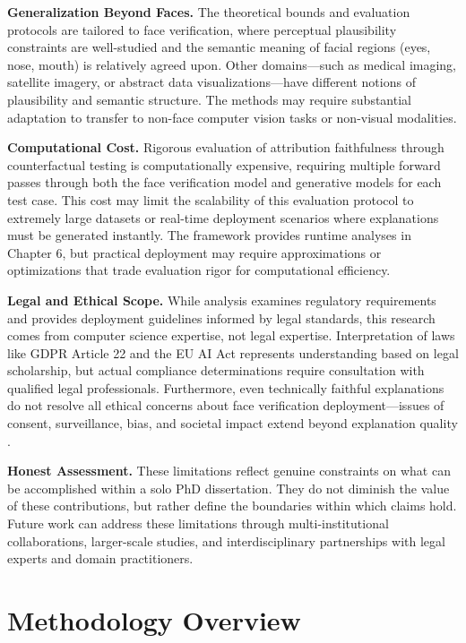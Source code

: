 \textbf{Generalization Beyond Faces.} The theoretical bounds and evaluation protocols are tailored to face verification, where perceptual plausibility constraints are well-studied and the semantic meaning of facial regions (eyes, nose, mouth) is relatively agreed upon. Other domains---such as medical imaging, satellite imagery, or abstract data visualizations---have different notions of plausibility and semantic structure. The methods may require substantial adaptation to transfer to non-face computer vision tasks or non-visual modalities.

\textbf{Computational Cost.} Rigorous evaluation of attribution faithfulness through counterfactual testing is computationally expensive, requiring multiple forward passes through both the face verification model and generative models for each test case. This cost may limit the scalability of this evaluation protocol to extremely large datasets or real-time deployment scenarios where explanations must be generated instantly. The framework provides runtime analyses in Chapter 6, but practical deployment may require approximations or optimizations that trade evaluation rigor for computational efficiency.

\textbf{Legal and Ethical Scope.} While analysis examines regulatory requirements and provides deployment guidelines informed by legal standards, this research comes from computer science expertise, not legal expertise. Interpretation of laws like GDPR Article 22 and the EU AI Act represents understanding based on legal scholarship, but actual compliance determinations require consultation with qualified legal professionals. Furthermore, even technically faithful explanations do not resolve all ethical concerns about face verification deployment---issues of consent, surveillance, bias, and societal impact extend beyond explanation quality \cite{garvie2019perpetual,stark2019algorithmic}.

\textbf{Honest Assessment.} These limitations reflect genuine constraints on what can be accomplished within a solo PhD dissertation. They do not diminish the value of these contributions, but rather define the boundaries within which claims hold. Future work can address these limitations through multi-institutional collaborations, larger-scale studies, and interdisciplinary partnerships with legal experts and domain practitioners.

\section{Methodology Overview}
\label{sec:methodology}

